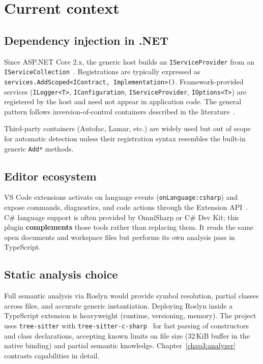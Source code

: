 \section{Current context}
\label{chap1:context}

\subsection{Dependency injection in .NET}

Since ASP.NET Core 2.x, the generic host builds an \texttt{IServiceProvider} from an \texttt{IServiceCollection}~\cite{ms-di}. Registrations are typically expressed as \texttt{services.AddScoped<IContract, Implementation>()}. Framework-provided services (\texttt{ILogger<T>}, \texttt{IConfiguration}, \texttt{IServiceProvider}, \texttt{IOptions<T>}) are registered by the host and need not appear in application code. The general pattern follows inversion-of-control containers described in the literature~\cite{fowler-di}.

Third-party containers (Autofac, Lamar, etc.) are widely used but out of scope for automatic detection unless their registration syntax resembles the built-in generic \texttt{Add*} methods.

\subsection{Editor ecosystem}

VS Code extensions activate on language events (\texttt{onLanguage:csharp}) and expose commands, diagnostics, and code actions through the Extension API~\cite{vscode-api}. C\# language support is often provided by OmniSharp or C\# Dev Kit; this plugin \textbf{complements} those tools rather than replacing them. It reads the same open documents and workspace files but performs its own analysis pass in TypeScript.

\subsection{Static analysis choice}

Full semantic analysis via Roslyn would provide symbol resolution, partial classes across files, and accurate generic instantiation. Deploying Roslyn inside a TypeScript extension is heavyweight (runtime, versioning, memory). The project uses \texttt{tree-sitter} with \texttt{tree-sitter-c-sharp}~\cite{tree-sitter,tree-sitter-csharp} for fast parsing of constructors and class declarations, accepting known limits on file size (32\,KiB buffer in the native binding) and partial semantic knowledge. Chapter~\ref{chap3:analyzer} contrasts capabilities in detail.

